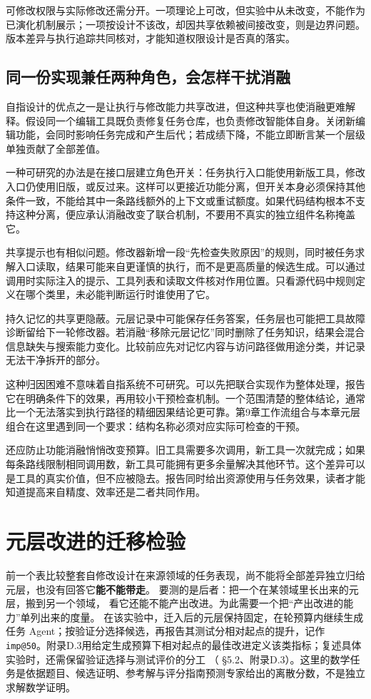 可修改权限与实际修改还需分开。一项理论上可改，但实验中从未改变，不能作为已演化机制展示；一项按设计不该改，却因共享依赖被间接改变，则是边界问题。版本差异与执行追踪共同核对，才能知道权限设计是否真的落实。

\subsection{同一份实现兼任两种角色，会怎样干扰消融}
\label{sec:ch12-sharedimplementation}

自指设计的优点之一是让执行与修改能力共享改进，但这种共享也使消融更难解释。假设同一个编辑工具既负责修复任务仓库，也负责修改智能体自身。关闭新编辑功能，会同时影响任务完成和产生后代；若成绩下降，不能立即断言某一个层级单独贡献了全部差值。

一种可研究的办法是在接口层建立角色开关：任务执行入口能使用新版工具，修改入口仍使用旧版，或反过来。这样可以更接近功能分离，但开关本身必须保持其他条件一致，不能给其中一条路线额外的上下文或重试额度。如果代码结构根本不支持这种分离，便应承认消融改变了联合机制，不要用不真实的独立组件名称掩盖它。

共享提示也有相似问题。修改器新增一段“先检查失败原因”的规则，同时被任务求解入口读取，结果可能来自更谨慎的执行，而不是更高质量的候选生成。可以通过调用时实际注入的提示、工具列表和读取文件核对作用位置。只看源代码中规则定义在哪个类里，未必能判断运行时谁使用了它。

持久记忆的共享更隐蔽。元层记录中可能保存任务答案，任务层也可能把工具故障诊断留给下一轮修改器。若消融“移除元层记忆”同时删除了任务知识，结果会混合信息缺失与搜索能力变化。比较前应先对记忆内容与访问路径做用途分类，并记录无法干净拆开的部分。

这种归因困难不意味着自指系统不可研究。可以先把联合实现作为整体处理，报告它在明确条件下的效果，再用较小干预检查机制。一个范围清楚的整体结论，通常比一个无法落实到执行路径的精细因果结论更可靠。第9章工作流组合与本章元层组合在这里遇到同一个要求：结构名称必须对应实际可检查的干预。

还应防止功能消融悄悄改变预算。旧工具需要多次调用，新工具一次就完成；如果每条路线限制相同调用数，新工具可能拥有更多余量解决其他环节。这个差异可以是工具的真实价值，但不应被隐去。报告同时给出资源使用与任务效果，读者才能知道提高来自精度、效率还是二者共同作用。

\section{元层改进的迁移检验}
\label{sec:ch12-transfer}

\begin{sloppypar}
前一个表比较整套自修改设计在来源领域的任务表现，尚不能将全部差异独立归给元层，也没有回答它\textbf{能不能带走}。
要测的是后者：把一个在某领域里长出来的元层，搬到另一个领域，
看它还能不能产出改进。为此需要一个把“产出改进的能力”单列出来的度量。
在该实验中，迁入后的元层保持固定，在轮预算内继续生成任务 Agent；按验证分选择候选，再报告其测试分相对起点的提升，记作 \texttt{imp@50}。附录D.3用给定生成预算下相对起点的最佳改进定义该类指标；复述具体实验时，还需保留验证选择与测试评价的分工
（\cite{hyperagents-2603} §5.2、附录D.3）。这里的数学任务是依据题目、候选证明、参考解与评分指南预测专家给出的离散分数，不是独立求解数学证明。
\end{sloppypar}

